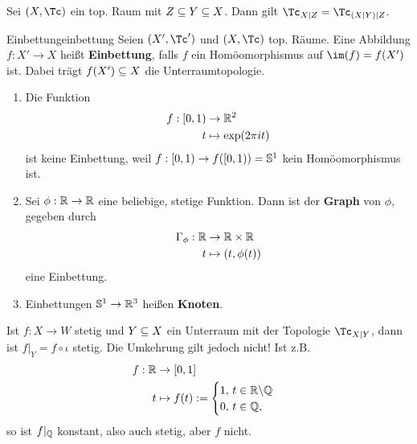 \begin{bemerkung}
Sei $(X, \Tc)$ ein top. Raum mit $Z \subseteq Y \subseteq X$. Dann gilt $\Tc_{X|Z} = \Tc_{(X|Y)|Z}$.
\end{bemerkung}
\begin{definition}{Einbettung}{einbettung}
Seien $(X', \Tc')$ und $(X,\Tc)$ top. Räume. Eine Abbildung $f: X' \to X$ heißt \textbf{Einbettung}, falls $f$ ein Homöomorphismus auf $\im (f) = f(X')$ ist. Dabei trägt $f(X') \subseteq X$ die Unterraumtopologie. 
\end{definition}
\begin{beispiele}
\begin{enumerate}
\item Die Funktion
\begin{equation}
\begin{split}
f: [0,1) &\to \mathbb{R}^2 \\
t &\mapsto \exp(2 \pi it)
\end{split}
\end{equation}
ist keine Einbettung, weil $f: [0,1) \to f([0,1)) = \mathbb{S}^1$ kein Homöomorphismus ist.
\item Sei $\phi: \mathbb{R} \to \mathbb{R}$ eine beliebige, stetige Funktion. Dann ist der \textbf{Graph} von $\phi$, gegeben durch
\begin{equation}
\begin{split}
\Gamma_\phi: \mathbb{R} &\to \mathbb{R} \times \mathbb{R} \\
t &\mapsto (t, \phi(t))
\end{split}
\end{equation}
eine Einbettung.
\item Einbettungen $\mathbb{S}^1 \to \mathbb{R}^3$ heißen \textbf{Knoten}.
\end{enumerate}
\end{beispiele}
\begin{warning}
Ist $f: X \to W$ stetig und $Y \subseteq X$ ein Unterraum mit der Topologie $\Tc_{X|Y}$, dann ist $f|_Y = f \circ \iota$ stetig. Die Umkehrung gilt jedoch nicht! Ist z.B. 
\begin{equation}
\begin{split}
f: \mathbb{R} &\to [0,1]\\
t &\mapsto f(t):=\begin{cases} 1, \, t \in \mathbb{R} \backslash \mathbb{Q} \\0, \, t \in \mathbb{Q}, \end{cases}
\end{split}
\end{equation}
so ist $f|_{\mathbb{Q}}$ konstant, also auch stetig, aber $f$ nicht.
\end{warning}
